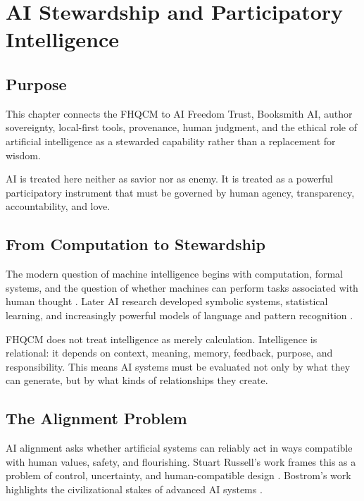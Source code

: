 \chapter{AI Stewardship and Participatory Intelligence}

\section{Purpose}

This chapter connects the FHQCM to AI Freedom Trust, Booksmith AI, author sovereignty, local-first tools, provenance, human judgment, and the ethical role of artificial intelligence as a stewarded capability rather than a replacement for wisdom.

AI is treated here neither as savior nor as enemy. It is treated as a powerful participatory instrument that must be governed by human agency, transparency, accountability, and love.


\section{From Computation to Stewardship}

The modern question of machine intelligence begins with computation, formal systems, and the question of whether machines can perform tasks associated with human thought \cite{turing1950ComputingMachinery}. Later AI research developed symbolic systems, statistical learning, and increasingly powerful models of language and pattern recognition \cite{russellNorvig2020AI}.

FHQCM does not treat intelligence as merely calculation. Intelligence is relational: it depends on context, meaning, memory, feedback, purpose, and responsibility. This means AI systems must be evaluated not only by what they can generate, but by what kinds of relationships they create.

\section{The Alignment Problem}

AI alignment asks whether artificial systems can reliably act in ways compatible with human values, safety, and flourishing. Stuart Russell's work frames this as a problem of control, uncertainty, and human-compatible design \cite{russell2019HumanCompatible}. Bostrom's work highlights the civilizational stakes of advanced AI systems \cite{bostrom2014Superintelligence}.

